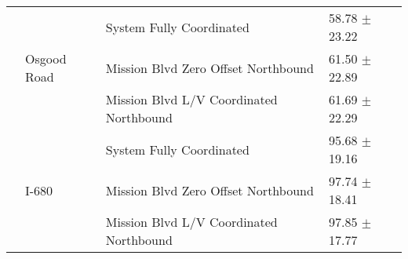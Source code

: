 \begin{tabular}{llll}
 & \multirow[t]{3}{*}{Osgood Road} & System Fully Coordinated & 58.78 $\pm$ 23.22 \\
 &  & Mission Blvd Zero Offset Northbound & 61.50 $\pm$ 22.89 \\
 &  & Mission Blvd L/V Coordinated Northbound & 61.69 $\pm$ 22.29 \\
 & \multirow[t]{3}{*}{I-680} & System Fully Coordinated & 95.68 $\pm$ 19.16 \\
 &  & Mission Blvd Zero Offset Northbound & 97.74 $\pm$ 18.41 \\
 &  & Mission Blvd L/V Coordinated Northbound & 97.85 $\pm$ 17.77 \\
\bottomrule
\end{tabular}
